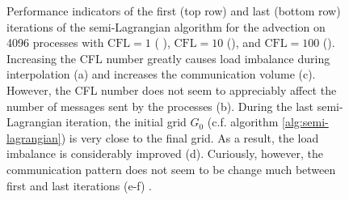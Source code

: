 \begin{figure}[htbp]
\begin{center}
	\end{center}
	\caption{Performance indicators of the first (top row) and last (bottom row) iterations of the semi-Lagrangian algorithm for the advection on 4096 processes with $\text{CFL} = 1$ (  ), $\text{CFL} = 10$ (), and $\text{CFL} = 100$ (). Increasing the CFL number greatly causes load imbalance during interpolation (a) and increases the communication volume (c). However, the CFL number does not seem to appreciably affect the number of messages sent by the processes (b). During the last semi-Lagrangian iteration, the initial grid $G_0$ (c.f. algorithm \ref{alg:semi-lagrangian}) is very close to the final grid. As a result, the load imbalance is considerably improved (d). Curiously, however, the communication pattern does not seem to be change much between first and last iterations (e-f)  .}
	\label{fig:communication_4096}
\end{figure}

